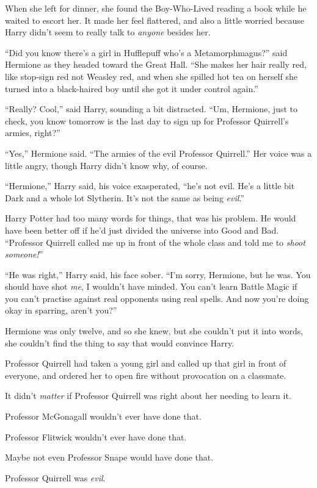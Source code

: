 When she left for dinner, she found the Boy-Who-Lived reading a book while he waited to escort her. It made her feel flattered, and also a little worried because Harry didn’t seem to really talk to \emph{anyone} besides her.

“Did you know there’s a girl in Hufflepuff who’s a Metamorphmagus?” said Hermione as they headed toward the Great Hall.
“She makes her hair really red, like stop-sign red not Weasley red, and when she spilled hot tea on herself she turned into a black-haired boy until she got it under control again.”

“Really? Cool,” said Harry, sounding a bit distracted.
“Um, Hermione, just to check, you know tomorrow is the last day to sign up for Professor Quirrell’s armies, right?”

“Yes,” Hermione said.
“The armies of the evil Professor Quirrell.” Her voice was a little angry, though Harry didn’t know why, of course.

“Hermione,” Harry said, his voice exasperated, “he’s not evil. He’s a little bit Dark and a whole lot Slytherin. It’s not the same as being \emph{evil}.”

Harry Potter had too many words for things, that was his problem. He would have been better off if he’d just divided the universe into Good and Bad.
“Professor Quirrell called me up in front of the whole class and told me to \emph{shoot someone!}”

“He was right,” Harry said, his face sober.
“I’m sorry, Hermione, but he was. You should have shot \emph{me}, I wouldn’t have minded. You can’t learn Battle Magic if you can’t practise against real opponents using real spells. And now you’re doing okay in sparring, aren’t you?”

Hermione was only twelve, and so she knew, but she couldn’t put it into words, she couldn’t find the thing to say that would convince Harry.

Professor Quirrell had taken a young girl and called up that girl in front of everyone, and ordered her to open fire without provocation on a classmate.

It didn’t \emph{matter} if Professor Quirrell was right about her needing to learn it.

Professor McGonagall wouldn’t ever have done that.

Professor Flitwick wouldn’t ever have done that.

Maybe not even Professor Snape would have done that.

Professor Quirrell was \emph{evil}.

